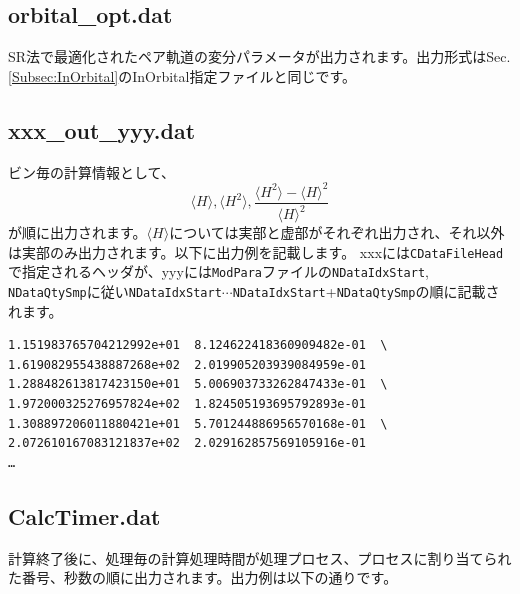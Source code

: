 \subsection{orbital\_opt.dat}
SR法で最適化されたペア軌道の変分パラメータが出力されます。出力形式はSec. \ref{Subsec:InOrbital}のInOrbital指定ファイルと同じです。

\subsection{xxx\_out\_yyy.dat}
ビン毎の計算情報として、
\begin{equation}
\langle H \rangle, \langle H^2 \rangle, \frac{\langle H^2 \rangle- \langle H \rangle^2 }{\langle H \rangle^2} \nonumber
\end{equation}
が順に出力されます。$\langle H \rangle$については実部と虚部がそれぞれ出力され、それ以外は実部のみ出力されます。以下に出力例を記載します。
xxxには\verb|CDataFileHead|で指定されるヘッダが、yyyには\verb|ModPara|ファイルの\verb|NDataIdxStart|, \verb|NDataQtySmp|に従い\verb|NDataIdxStart|$\cdots$\verb|NDataIdxStart|+\verb|NDataQtySmp|の順に記載されます。

\begin{minipage}{13cm}
\begin{screen}
\begin{verbatim}
1.151983765704212992e+01  8.124622418360909482e-01  \
1.619082955438887268e+02  2.019905203939084959e-01 
1.288482613817423150e+01  5.006903733262847433e-01  \ 
1.972000325276957824e+02  1.824505193695792893e-01
1.308897206011880421e+01  5.701244886956570168e-01  \
2.072610167083121837e+02  2.029162857569105916e-01
…
\end{verbatim}
\end{screen}
\end{minipage}

\subsection{CalcTimer.dat }
計算終了後に、処理毎の計算処理時間が処理プロセス、プロセスに割り当てられた番号、秒数の順に出力されます。出力例は以下の通りです。


